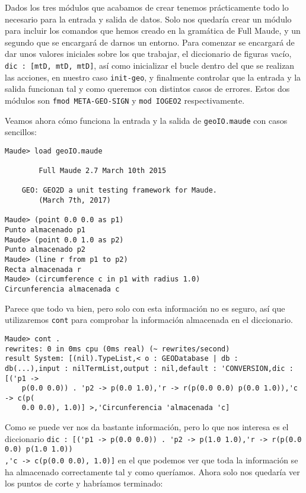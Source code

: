 Dados los tres módulos que acabamos de crear tenemos prácticamente todo lo necesario para la entrada y salida de datos. Solo nos quedaría crear un módulo para incluir los comandos que hemos creado en la gramática de Full Maude, y un segundo que se encargará de darnos un entorno. Para comenzar se encargará de dar unos valores iniciales sobre los que trabajar, el diccionario de figuras vacío, \verb"dic : [mtD, mtD, mtD]", así como inicializar el bucle dentro del que se realizan las acciones, en nuestro caso \verb"init-geo", y finalmente controlar que la entrada y la salida funcionan tal y como queremos con distintos casos de errores. Estos dos módulos son \verb"fmod META-GEO-SIGN" y \verb"mod IOGEO2" respectivamente.\par

Veamos ahora cómo funciona la entrada y la salida de \texttt{geoIO.maude} con casos sencillos:\par 

{\codesize
\begin{verbatim}
Maude> load geoIO.maude

	    Full Maude 2.7 March 10th 2015

	GEO: GEO2D a unit testing framework for Maude.
		(March 7th, 2017)

Maude> (point 0.0 0.0 as p1)
Punto almacenado p1
Maude> (point 0.0 1.0 as p2)
Punto almacenado p2
Maude> (line r from p1 to p2)
Recta almacenada r
Maude> (circumference c in p1 with radius 1.0)
Circunferencia almacenada c
\end{verbatim}
}

Parece que todo va bien, pero solo con esta información no es seguro, así que utilizaremos \verb"cont" para comprobar la información almacenada en el diccionario.\par

{\codesize
\begin{verbatim}
Maude> cont .
rewrites: 0 in 0ms cpu (0ms real) (~ rewrites/second)
result System: [(nil).TypeList,< o : GEODatabase | db : 
db(...),input : nilTermList,output : nil,default : 'CONVERSION,dic : [('p1 ->
    p(0.0 0.0)) . 'p2 -> p(0.0 1.0),'r -> r(p(0.0 0.0) p(0.0 1.0)),'c -> c(p(
    0.0 0.0), 1.0)] >,'Circunferencia 'almacenada 'c]
\end{verbatim}
}

Como se puede ver nos da bastante información, pero lo que nos interesa es el diccionario \verb"dic : [('p1 -> p(0.0 0.0)) . 'p2 -> p(1.0 1.0),'r -> r(p(0.0 0.0) p(1.0 1.0))"\\ \verb",'c -> c(p(0.0 0.0), 1.0)]" en el que podemos ver que toda la información se ha almacenado correctamente tal y como queríamos. Ahora solo nos quedaría ver los puntos de corte y habríamos terminado:\par

